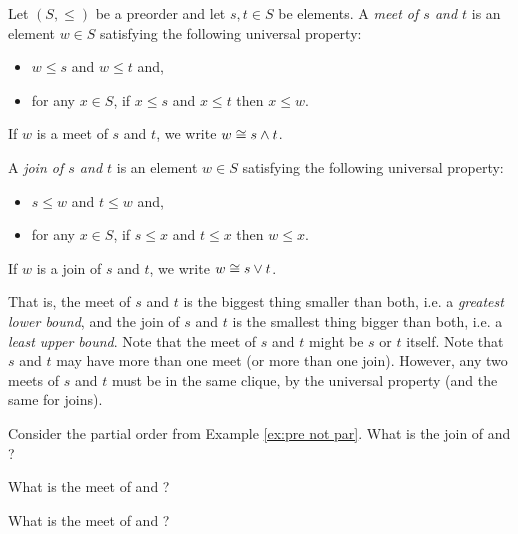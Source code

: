 \begin{definitionENG}\label{def:meets and joins}
Let $(S,\leq)$ be a preorder and let $s,t\in S$ be elements. A {\em meet of $s$ and $t$} is an element $w\in S$ satisfying the following universal property: 
\begin{itemize}
\item $w\leq s$ and $w\leq t$ and, 
\item for any $x\in S$, if $x\leq s$ and $x\leq t$ then $x\leq w$.
\end{itemize}
If $w$ is a meet of $s$ and $t$, we write $w\cong s\wedge t$.

A {\em join of $s$ and $t$} is an element $w\in S$ satisfying the following universal property: 
\begin{itemize}
\item $s\leq w$ and $t\leq w$ and, 
\item for any $x\in S$, if $s\leq x$ and $t\leq x$ then $w\leq x$.
\end{itemize}
If $w$ is a join of $s$ and $t$, we write $w\cong s\vee t$.
\end{definitionENG}

\begin{definitionRUS}\label{def:meets and joins}
\end{definitionRUS}

\begin{blockENG}
That is, the meet of $s$ and $t$ is the biggest thing smaller than both, i.e. a {\em greatest lower bound}, and the join of $s$ and $t$ is the smallest thing bigger than both, i.e. a {\em least upper bound}. Note that the meet of $s$ and $t$ might be $s$ or $t$ itself.  Note that $s$ and $t$ may have more than one meet (or more than one join). However, any two meets of $s$ and $t$ must be in the same clique, by the universal property (and the same for joins).
\end{blockENG}

\begin{blockRUS}
\end{blockRUS}

\begin{exerciseENG}
Consider the partial order from Example \ref{ex:pre not par}. 
\sexc What is the join of  and ? 
\item What is the meet of  and ? 
\item What is the meet of  and ?
\endsexc
\end{exerciseENG}


